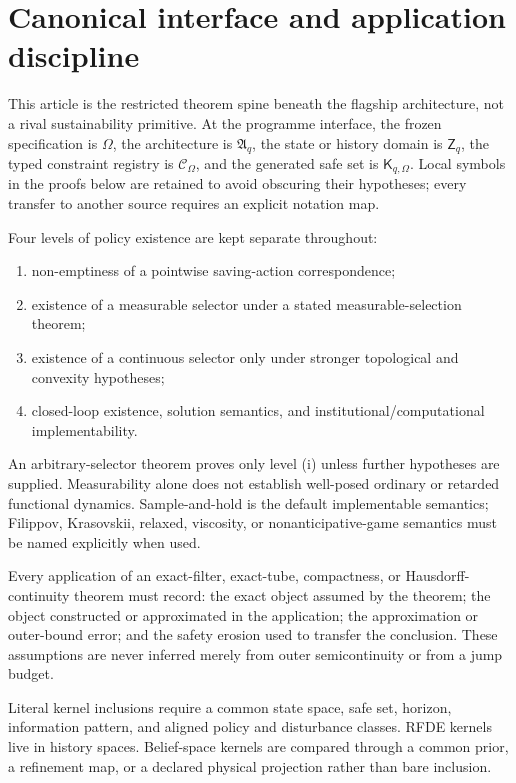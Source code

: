 \documentclass[11pt]{article}
\theoremstyle{definition}
\begin{document}
\section*{Canonical interface and application discipline}
This article is the restricted theorem spine beneath the flagship architecture, not a rival sustainability primitive. At the programme interface, the frozen specification is $\Omega$, the architecture is $\mathfrak A_q$, the state or history domain is $\mathsf Z_q$, the typed constraint registry is $\mathscr C_\Omega$, and the generated safe set is $\mathsf K_{q,\Omega}$. Local symbols in the proofs below are retained to avoid obscuring their hypotheses; every transfer to another source requires an explicit notation map.

Four levels of policy existence are kept separate throughout:
\begin{enumerate}[label=(\roman*)]
\item non-emptiness of a pointwise saving-action correspondence;
\item existence of a measurable selector under a stated measurable-selection theorem;
\item existence of a continuous selector only under stronger topological and convexity hypotheses;
\item closed-loop existence, solution semantics, and institutional/computational implementability.
\end{enumerate}
An arbitrary-selector theorem proves only level (i) unless further hypotheses are supplied. Measurability alone does not establish well-posed ordinary or retarded functional dynamics. Sample-and-hold is the default implementable semantics; Filippov, Krasovskii, relaxed, viscosity, or nonanticipative-game semantics must be named explicitly when used.

Every application of an exact-filter, exact-tube, compactness, or Hausdorff-continuity theorem must record: the exact object assumed by the theorem; the object constructed or approximated in the application; the approximation or outer-bound error; and the safety erosion used to transfer the conclusion. These assumptions are never inferred merely from outer semicontinuity or from a jump budget.

Literal kernel inclusions require a common state space, safe set, horizon, information pattern, and aligned policy and disturbance classes. RFDE kernels live in history spaces. Belief-space kernels are compared through a common prior, a refinement map, or a declared physical projection rather than bare inclusion.
\end{document}

